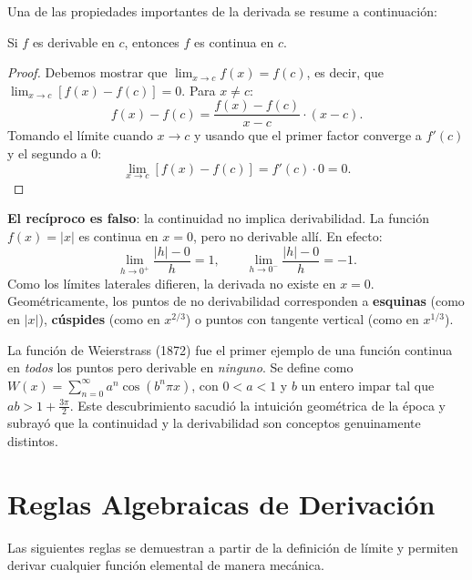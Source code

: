 Una de las propiedades importantes de la derivada se resume a continuación:
\begin{theorem}
Si $f$ es derivable en $c$, entonces $f$ es continua en $c$.
\end{theorem}

\begin{proof}
Debemos mostrar que $\lim_{x\to c}f(x) = f(c)$, es decir, que
$\lim_{x\to c}[f(x)-f(c)] = 0$. Para $x\neq c$:
\[
f(x)-f(c) = \frac{f(x)-f(c)}{x-c}\cdot(x-c).
\]
Tomando el límite cuando $x\to c$ y usando que el primer factor converge
a $f'(c)$ y el segundo a $0$:
\[
\lim_{x\to c}[f(x)-f(c)] = f'(c)\cdot 0 = 0.
\]
\end{proof}

\begin{rem}
\textbf{El recíproco es falso}: la continuidad no implica derivabilidad.
La función $f(x)=|x|$ es continua en $x=0$, pero no derivable allí. En
efecto:
\[
\lim_{h\to 0^+}\frac{|h|-0}{h} = 1, \qquad
\lim_{h\to 0^-}\frac{|h|-0}{h} = -1.
\]
Como los límites laterales difieren, la derivada no existe en $x=0$.
Geométricamente, los puntos de no derivabilidad corresponden a
\textbf{esquinas} (como en $|x|$), \textbf{cúspides} (como en
$x^{2/3}$) o puntos con tangente vertical (como en $x^{1/3}$).
\end{rem}

\begin{rem}
La función de Weierstrass (1872) fue el primer ejemplo de una función continua en \emph{todos} los puntos pero derivable en \emph{ninguno}. Se define como $W(x) = \sum_{n=0}^{\infty} a^n \cos(b^n\pi x)$, con $0<a<1$ y $b$ un entero impar tal que $ab > 1+\frac{3\pi}{2}$. Este descubrimiento sacudió la intuición geométrica de la época y subrayó que la continuidad y la derivabilidad son conceptos genuinamente distintos.
\end{rem}

\section{Reglas Algebraicas de Derivación}

Las siguientes reglas se demuestran a partir de la definición de límite
y permiten derivar cualquier función elemental de manera mecánica.

